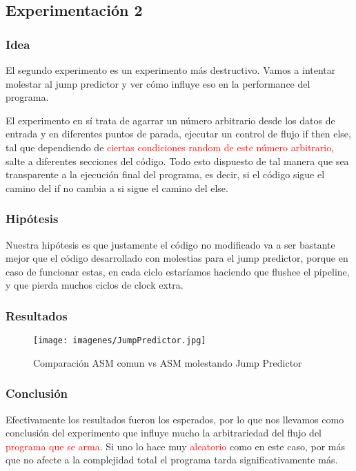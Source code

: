 \subsection{Experimentación 2}	

\subsubsection{Idea}
\par{El segundo experimento es un experimento más destructivo. Vamos a intentar molestar al jump predictor y ver cómo influye eso en la  performance del programa.}
\par{El experimento en sí trata de agarrar un número arbitrario desde los datos de entrada y en diferentes puntos de parada, ejecutar un control de flujo if then else, tal que dependiendo de \textcolor{red}{ciertas condiciones random de este número arbitrario}, salte a diferentes secciones del código. Todo esto dispuesto de tal manera que sea transparente a la ejecución final del programa, es decir, si el código sigue el camino del if no cambia a si sigue el camino del else.}

\subsubsection{Hipótesis}
\par{Nuestra hipótesis es que justamente el código no modificado va a ser bastante mejor que el código desarrollado con molestias para el jump predictor, porque en caso de funcionar estas, en cada ciclo estaríamos haciendo que flushee el pipeline, y que pierda muchos ciclos de clock extra.}
	
\subsubsection{Resultados}

\medskip\begin{figure}[h!]
\centering
\captionsetup{justification=centering}
	\texttt{[image: imagenes/JumpPredictor.jpg]}
	\caption[center]{Comparación ASM comun vs ASM molestando Jump Predictor}
\end{figure}

\medskip

\subsubsection{Conclusión}
\par{Efectivamente los resultados fueron los esperados, por lo que nos llevamos como conclusión del experimento que influye mucho la arbitrariedad del flujo del \textcolor{red}{programa que se arma}. Si uno lo hace muy \textcolor{red}{aleatorio} como en este caso, por más que no afecte a la complejidad total el programa tarda significativamente más.}

